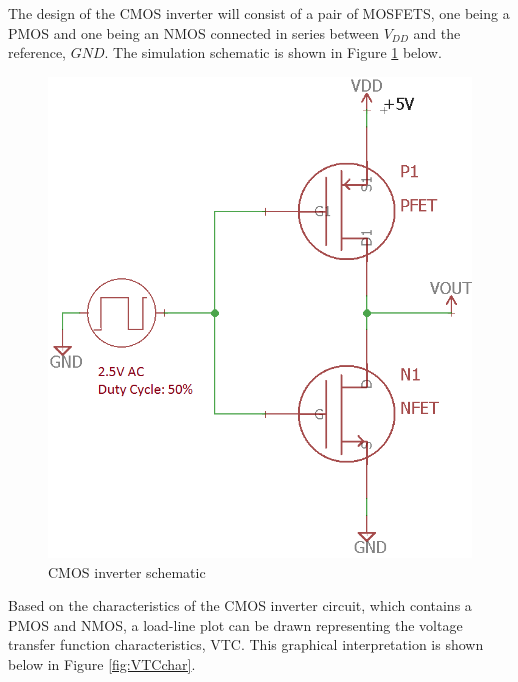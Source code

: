 \noindent The design of the CMOS inverter will consist of a pair of MOSFETS, one being a PMOS and one being an NMOS connected in series between $V_{DD}$ and the reference, $GND$. The simulation schematic is shown in Figure \ref{fig:cmosinvert} below.
\begin{figure}[H]
    \centering
        \centering
        \includegraphics[scale = .35]{CircuitDevelopment/cd4007SIM/CMOSInevrter.png}
        \caption{CMOS inverter schematic}
        \label{fig:cmosinvert}
\end{figure} 

Based on the characteristics of the CMOS inverter circuit, which contains a PMOS and NMOS, a load-line plot can be drawn representing the voltage transfer function characteristics, VTC. This graphical interpretation is shown below in Figure \ref{fig:VTCchar}.

